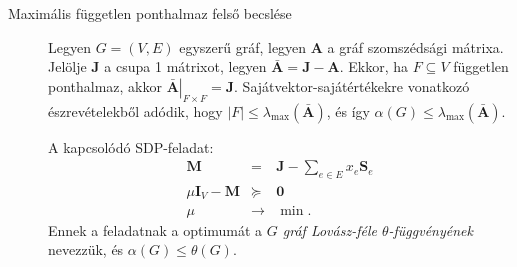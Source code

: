 \documentclass[DIV=15,appendixprefix]{scrreprt}
\theoremstyle{definition}
\theoremstyle{remark}
\DeclareMathOperator{\T}{T}
\DeclareMathOperator{\diag}{diag}
\begin{document}
\begin{description}
	\item[Maximális független ponthalmaz felső becslése]  Legyen $ G = \left( V,{} E \right) $
		egyszerű gráf, legyen $ \mathbf{ A } $ a gráf szomszédsági mátrixa. Jelölje $ \mathbf{ J } $
		a csupa 1 mátrixot, legyen $ \bar{ \mathbf{ A } } = \mathbf{ J } - \mathbf{ A } $. Ekkor, ha
		$ F \subseteq V $ független ponthalmaz, akkor $ \left. \bar{ \mathbf{ A } }
		\right|_{ F \times F } = \mathbf{ J } $. Sajátvektor-sajátértékekre vonatkozó
		észrevételekből adódik, hogy $ \left| F \right| \le \lambda_{ \max } \left(
		\bar{ \mathbf{ A } } \right) $, és így $ \alpha \left( G \right)  \le \lambda_{ \max }
		\left( \bar{ \mathbf{ A } } \right) $.

		A kapcsolódó SDP-feladat:
%
		\begin{equation*}
	 		\begin{array}{rcl}
				\mathbf{ M } 									&		=		& \mathbf{ J } -
					\sum_{ e \in E } x_{ e } \mathbf{ S }_{ e }\\
				\mu \mathbf{ I }_{ V } - \mathbf{ M }			&		\succeq	& \mathbf{ 0 }\\
				\hline
				\mu	&	\rightarrow	&	\min.
			\end{array}
		\end{equation*}
		Ennek a feladatnak a optimumát a \emph{$ G $ gráf Lovász-féle $ \theta $-függvényének}
		nevezzük, és $ \alpha \left( G \right) \le \theta \left( G \right) $.


\end{description}
\end{document}
